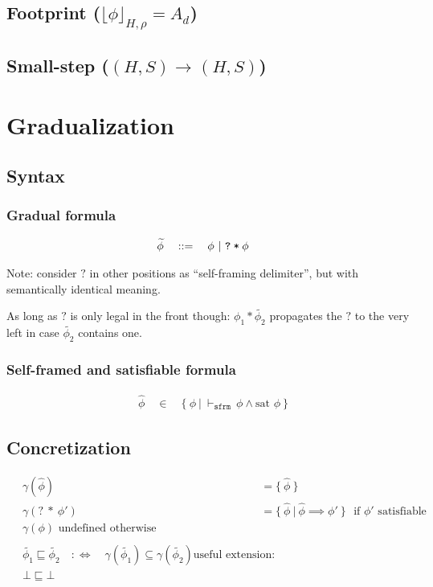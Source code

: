 \documentclass[11pt,a4paper]{article}
\newcommand{\grad}[1]{\widetilde{#1}}
\newcommand{\ttt}{\texttt}
\newcommand{\qm}{\ttt{?}}
\newcommand{\withqm}[1]{\ttt{\qm\:*\:$#1$}}
\newcommand{\sfrmphi}{\ensuremath{\vdash_\texttt{sfrm}}\,}
\newcommand\floor[1]{\lfloor#1\rfloor}
\newcommand{\dynamicFP}[3]{\ensuremath{\floor{#3}_{#1,#2}}}
\newcommand{\sstepGeneric}[5]{({#1}, {#2}) \rightarrow^{#3} ({#4}, {#5})}
\newcommand{\sstep}[4]{\sstepGeneric {#1} {#2} {} {#3} {#4}}
\begin{document}
\subsection{Footprint ($\dynamicFP {H} {\rho} {\phi} = A_d$)}


\subsection{Small-step ($\sstep H S H S$)}


\section{Gradualization}
\subsection{Syntax}
\subsubsection{Gradual formula}
\begin{align*}
&\grad{\phi} \quad ::= \quad \phi ~|~ \withqm{\phi}
\end{align*}

Note: consider $?$ in other positions as ``self-framing delimiter'', but with semantically identical meaning.

As long as $?$ is only legal in the front though: $\phi_1 * \grad{\phi_2}$ propagates the $?$ to the very left in case $\grad{\phi_2}$ contains one.

\subsubsection{Self-framed and satisfiable formula}
\begin{align*}
&\hat{\phi} \quad \in \quad \{~ \phi ~|~ \sfrmphi \phi \wedge \text{sat~} \phi ~\}
\end{align*}

\subsection{Concretization}
\begin{align*}
&\gamma(\hat{\phi}) ~&&= \{~ \hat{\phi} ~\} \\
&\gamma(?\:*\:\phi') ~&&= \{~ \hat{\phi} ~|~ \hat{\phi} \implies \phi' ~\} \text{~~if $\phi'$ satisfiable} \\
&\gamma(\phi) \text{ undefined otherwise} \\
~\\
&\grad{\phi_1} \sqsubseteq \grad{\phi_2} \quad:\iff\quad \gamma(\grad{\phi_1}) \subseteq \gamma(\grad{\phi_2})
\text{useful extension:}\\
&\bot \sqsubseteq \bot
\end{align*}
\end{document}
